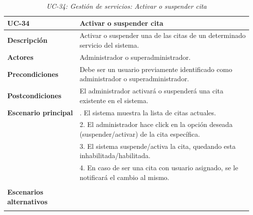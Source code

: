 \begin{table}
  \begin{center}
    \begin{tabularx}{16.4cm}{|l|X|}
      \hline
      \textbf{UC-34} & \textbf{Activar o suspender cita}\\
      \hline
      \textbf{Descripción} & Activar o suspender una de las citas de un determinado servicio del sistema.\\
      \hline
      \textbf{Actores} & Administrador o superadministrador.\\
      \hline
      \textbf{Precondiciones} & Debe ser un usuario previamente identificado como administrador o superadministrador.\\
      \hline
      \textbf{Postcondiciones} & El administrador activará o suspenderá una cita existente en el sistema.\\
      \hline
      \textbf{Escenario principal} & \smallskip 1. El sistema muestra la lista de citas actuales.\\
      & 2. El administrador hace click en la opción deseada (suspender/activar) de la cita específica.\\
      & 3. El sistema suspende/activa la cita, quedando esta inhabilitada/habilitada.\\
      & 4. En caso de ser una cita con usuario asignado, se le notificará el cambio al mismo.\\
      & \\
      \hline
      \textbf{Escenarios alternativos} & \smallskip \\
      & \\
      \hline
    \end{tabularx}
    \caption{\textit{UC-34: Gestión de servicios: Activar o suspender cita}}
    \label{tab:CU-activar-suspender-cita}
  \end{center}
\end{table}


